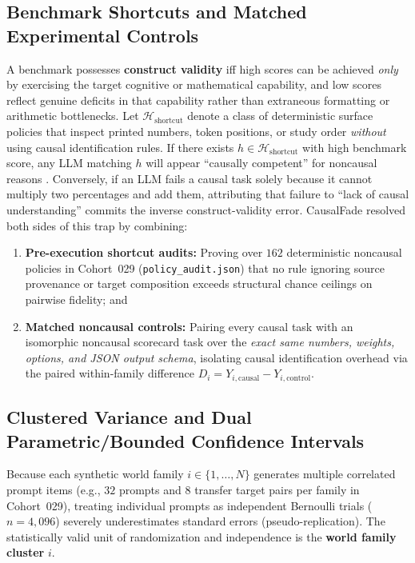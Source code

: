 \subsection{Benchmark Shortcuts and Matched Experimental Controls}
A benchmark possesses \textbf{construct validity} iff high scores can be achieved \emph{only} by exercising the target cognitive or mathematical capability, and low scores reflect genuine deficits in that capability rather than extraneous formatting or arithmetic bottlenecks. Let $\mathcal{H}_{\mathrm{shortcut}}$ denote a class of deterministic surface policies that inspect printed numbers, token positions, or study order \emph{without} using causal identification rules. If there exists $h \in \mathcal{H}_{\mathrm{shortcut}}$ with high benchmark score, any LLM matching $h$ will appear ``causally competent'' for noncausal reasons \citep{mccoy2019right}. Conversely, if an LLM fails a causal task solely because it cannot multiply two percentages and add them, attributing that failure to ``lack of causal understanding'' commits the inverse construct-validity error. CausalFade resolved both sides of this trap by combining:
\begin{enumerate}
  \item \textbf{Pre-execution shortcut audits:} Proving over $162$ deterministic noncausal policies in Cohort~029 (\texttt{policy\_audit.json}) that no rule ignoring source provenance or target composition exceeds structural chance ceilings on pairwise fidelity; and
  \item \textbf{Matched noncausal controls:} Pairing every causal task with an isomorphic noncausal scorecard task over the \emph{exact same numbers, weights, options, and JSON output schema}, isolating causal identification overhead via the paired within-family difference $D_i = Y_{i,\mathrm{causal}} - Y_{i,\mathrm{control}}$.
\end{enumerate}

\subsection{Clustered Variance and Dual Parametric/Bounded Confidence Intervals}
Because each synthetic world family $i \in \{1,\dots,N\}$ generates multiple correlated prompt items (e.g., $32$ prompts and $8$ transfer target pairs per family in Cohort~029), treating individual prompts as independent Bernoulli trials ($n=4{,}096$) severely underestimates standard errors (pseudo-replication). The statistically valid unit of randomization and independence is the \textbf{world family cluster} $i$.

